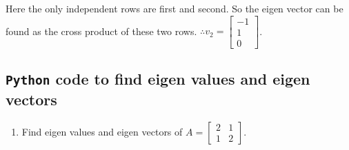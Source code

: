 \documentclass[
  letterpaper,
  DIV=11,
  numbers=noendperiod]{scrreprt}
\providecommand{\tightlist}{%
  \setlength{\itemsep}{0pt}\setlength{\parskip}{0pt}}\usepackage{longtable,booktabs,array}
\theoremstyle{plain}
\theoremstyle{definition}
\theoremstyle{remark}
\begin{document}
Here the only independent rows are first and second. So the eigen vector
can be found as the cross product of these two rows.
\(\therefore v_2=\begin{bmatrix}
    -1\\1\\0
\end{bmatrix}\).

\subsection{\texorpdfstring{\texttt{Python} code to find eigen values
and eigen
vectors}{Python code to find eigen values and eigen vectors}}\label{python-code-to-find-eigen-values-and-eigen-vectors}

\begin{enumerate}
\def\labelenumi{\arabic{enumi}.}
\tightlist
\item
  Find eigen values and eigen vectors of
  \(A=\begin{bmatrix} 2&1\\ 1&2\end{bmatrix}\).
\end{enumerate}
\end{document}
